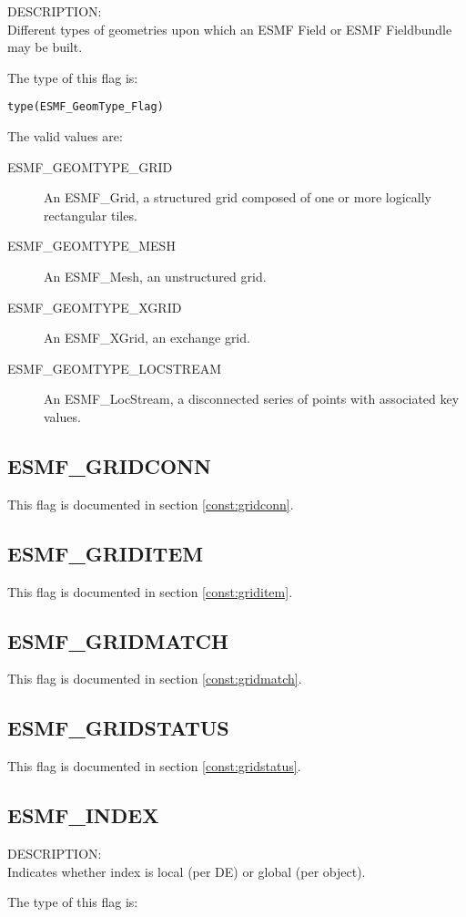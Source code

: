 {\sf DESCRIPTION:\\}
 Different types of geometries upon which an ESMF Field or ESMF Fieldbundle may
be built. 

The type of this flag is:

{\tt type(ESMF\_GeomType\_Flag)}

The valid values are:
\begin{description}
\item [ESMF\_GEOMTYPE\_GRID]
      An ESMF\_Grid, a structured grid composed of one or more logically rectangular tiles.
\item [ESMF\_GEOMTYPE\_MESH]
      An ESMF\_Mesh, an unstructured grid.
\item [ESMF\_GEOMTYPE\_XGRID]
      An ESMF\_XGrid, an exchange grid.
\item [ESMF\_GEOMTYPE\_LOCSTREAM]
      An ESMF\_LocStream, a disconnected series of points with associated key values.
\end{description}

\subsection{ESMF\_GRIDCONN}
This flag is documented in section \ref{const:gridconn}.

\subsection{ESMF\_GRIDITEM}
This flag is documented in section \ref{const:griditem}.

\subsection{ESMF\_GRIDMATCH}
This flag is documented in section \ref{const:gridmatch}.

\subsection{ESMF\_GRIDSTATUS}
This flag is documented in section \ref{const:gridstatus}.

\subsection{ESMF\_INDEX}
\label{const:indexflag}
{\sf DESCRIPTION:\\}
Indicates whether index is local (per DE) or global (per object).

The type of this flag is:

